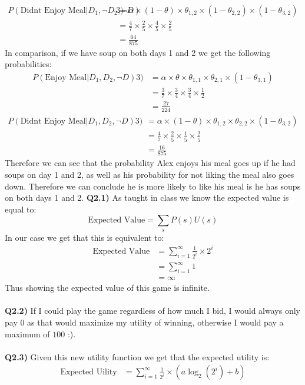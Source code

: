 \documentclass{article}
\begin{document}
\begin{titlepage}
\begin{align*}
P(\text{Didnt Enjoy Meal}  |D_1, \neg D_2, \neg D)3) &= \alpha \times (1-\theta) \times \theta_{1,2} \times (1-\theta_{2,2}) \times (1-\theta_{3,2}) \\
&= \frac{4}{7} \times \frac{2}{5} \times \frac{4}{5} \times \frac{2}{5} \\
&= \frac{64}{875}
\end{align*}
In comparison, if we have soup on both days 1 and 2 we get the following probabilities:
\begin{align*}
P(\text{Enjoy Meal}  |D_1, D_2, \neg D)3) &= \alpha \times \theta \times \theta_{1,1} \times \theta_{2,1} \times (1-\theta_{3,1}) \\
&= \frac{3}{7} \times \frac{3}{4} \times \frac{3}{4} \times \frac{1}{2} \\
&= \frac{27}{224}
\end{align*}
\begin{align*}
P(\text{Didnt Enjoy Meal}  |D_1, D_2, \neg D)3) &= \alpha \times (1-\theta) \times \theta_{1,2} \times \theta_{2,2} \times (1-\theta_{3,2}) \\
&= \frac{4}{7} \times \frac{2}{5} \times \frac{1}{5} \times \frac{2}{5} \\
&= \frac{16}{875}
\end{align*}
Therefore we can see that the probability Alex enjoys his meal goes up if he had soups on day 1 and 2, as well as his probability for not liking the meal also goes down. Therefore we can conclude he is more likely to like his meal is he has soups on both days 1 and 2.
\newpage
\textbf{Q2.1)} As taught in class we know the expected value is equal to:
\[ \text{Expected Value} = \sum_s P(s)U(s) \]
In our case we get that this is equivalent to:
\begin{align*}
\text{Expected Value} &= \sum^\infty_{i=1} \frac{1}{2^i}\times2^i \\
&= \sum^\infty_{i=1} 1 \\
&= \infty
\end{align*}
Thus showing the expected value of this game is infinite.\\\\
\textbf{Q2.2)} If I could play the game regardless of how much I bid, I would always only pay $0$ as that would maximize my utility of winning, otherwise I would pay a maximum of $100$ :).\\\\
\textbf{Q2.3)} Given this new utility function we get that the expected utility is:
\begin{align*}
\text{Expected Uility} &= \sum^\infty_{i=1} \frac{1}{2^i}\times(a\log_2(2^i) + b) \\

\end{align*}
\end{titlepage}
\end{document}
